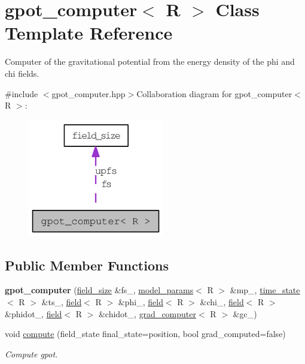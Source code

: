 \hypertarget{classgpot__computer}{
\section{gpot\_\-computer$<$ R $>$ Class Template Reference}
\label{classgpot__computer}
}


Computer of the gravitational potential from the energy density of the phi and chi fields.  


{\ttfamily \#include $<$gpot\_\-computer.hpp$>$}Collaboration diagram for gpot\_\-computer$<$ R $>$:\nopagebreak
\begin{figure}[H]
\begin{center}
\leavevmode
\includegraphics[width=168pt]{classgpot__computer__coll__graph}
\end{center}
\end{figure}
\subsection*{Public Member Functions}
\begin{DoxyCompactItemize}
\item 
\hypertarget{classgpot__computer_a31be021e9e6658a22bd07354e7e955a1}{
{\bfseries gpot\_\-computer} (\hyperlink{structfield__size}{field\_\-size} \&fs\_\-, \hyperlink{structmodel__params}{model\_\-params}$<$ R $>$ \&mp\_\-, \hyperlink{structtime__state}{time\_\-state}$<$ R $>$ \&ts\_\-, \hyperlink{classfield}{field}$<$ R $>$ \&phi\_\-, \hyperlink{classfield}{field}$<$ R $>$ \&chi\_\-, \hyperlink{classfield}{field}$<$ R $>$ \&phidot\_\-, \hyperlink{classfield}{field}$<$ R $>$ \&chidot\_\-, \hyperlink{classgrad__computer}{grad\_\-computer}$<$ R $>$ \&gc\_\-)}
\label{classgpot__computer_a31be021e9e6658a22bd07354e7e955a1}

\item 
void \hyperlink{classgpot__computer_adb1fb91c67e82a028c8c161007215915}{compute} (field\_\-state final\_\-state=position, bool grad\_\-computed=false)
\begin{DoxyCompactList}\small\item\em Compute gpot. \item\end{DoxyCompactList}\end{DoxyCompactItemize}
